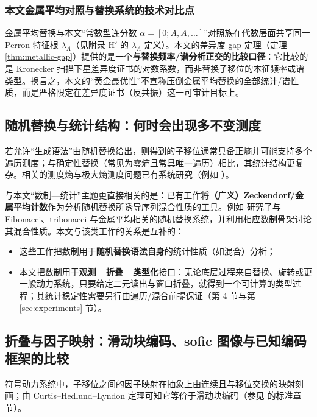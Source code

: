 \subsubsection{本文金属平均对照与替换系统的技术对比点}
金属平均替换与本文“常数型连分数 $\alpha=[0;A,A,\dots]$”对照族在代数层面共享同一 Perron 特征根 $\lambda_A$（见附录 H$'$ 的 \(\lambda_A\) 定义）。本文的差异度 gap 定理（定理 \ref{thm:metallic-gap}）提供的是一个\textbf{与替换频率/谱分析正交的比较口径}：它比较的是 Kronecker 扫描下星差异度证书的对数系数，而非替换子移位的本征频率或谱类型。换言之，本文的“黄金最优性”不宣称压倒金属平均替换的全部统计/谱性质，而是严格限定在差异度证书（反共振）这一可审计目标上。

\subsection{随机替换与统计结构：何时会出现多不变测度}

若允许“生成语法”由随机替换给出，则得到的子移位通常具备正熵并可能支持多个遍历测度；与确定性替换（常见为零熵且常具唯一遍历）相比，其统计结构更复杂。相关的测度熵与极大熵测度问题已有系统研究（例如 \cite{GohlkeMitchellRustSamuel2023}）。

与本文“数制—统计”主题更直接相关的是：已有工作将\textbf{（广义）Zeckendorf/金属平均计数}作为分析随机替换所诱导序列混合性质的工具。例如 \cite{ManiboMiroRustTadeo2020ZeckendorfMixing} 研究了与 Fibonacci、tribonacci 与金属平均相关的随机替换系统，并利用相应数制骨架讨论其混合性质。本文与该类工作的关系是互补的：
\begin{itemize}
  \item 这些工作把数制用于\textbf{随机替换语法自身}的统计性质（如混合）分析；
  \item 本文把数制用于\textbf{观测—折叠—类型化}接口：无论底层过程来自替换、旋转或更一般动力系统，只要给定二元读出与窗口折叠，就得到一个可计算的类型过程；其统计稳定性需要另行由遍历/混合前提保证（第 4 节与第 \ref{sec:experiments} 节）。
\end{itemize}

\subsection{折叠与因子映射：滑动块编码、sofic 图像与已知编码框架的比较}

符号动力系统中，子移位之间的因子映射在抽象上由连续且与移位交换的映射刻画；由 Curtis--Hedlund--Lyndon 定理可知它等价于滑动块编码（参见 \cite{LindMarcus1995} 的标准章节）。

